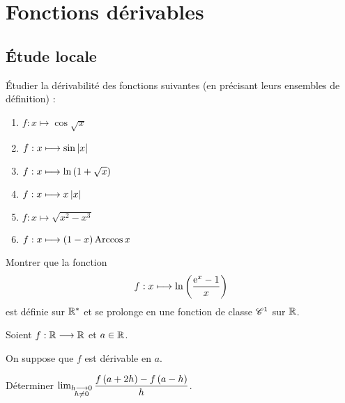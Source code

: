 \chapter{Fonctions dérivables}

\minitoc

\section{Étude locale}

\begin{exo}[Exercice 1]
Étudier la dérivabilité des fonctions suivantes (en précisant leurs ensembles de définition) :

\begin{enumerate}
\item \(f:x\mapsto\cos\sqrt{x}\) \\

\item \(f:x\longmapsto\sin\left\lvert x\right\rvert\) \\

\item \(f:x\longmapsto\ln\left(1+\sqrt{x}\right)\) \\

\item \(f:x\longmapsto x\left\lvert x\right\rvert\) \\

\item \(f:x\mapsto\sqrt{x^2-x^3}\) \\

\item \(f:x\longmapsto\left(1-x\right)\operatorname{Arccos} x\)
\end{enumerate}
\end{exo}

\begin{corr}
\end{corr}

\begin{exo}[Exercice 2]
Montrer que la fonction \[f:x\longmapsto\ln\left(\dfrac{\mathrm{e}^{x}-1}{x}\right)\] est définie sur \(\mathbb{R}^*\) et se prolonge en une fonction de classe \(\mathscr{C}^{1}\) sur \(\mathbb{R}\).
\end{exo}

\begin{corr}
\end{corr}

\begin{exo}[Exercice 3]
Soient \(f:\mathbb{R}\longrightarrow\mathbb{R}\) et \(a\in\mathbb{R}\).

On suppose que \(f\) est dérivable en \(a\).

Déterminer \(\lim_{\substack{h\longrightarrow0 \\ h\not=0}}\dfrac{f\left(a+2h\right)-f\left(a-h\right)}{h}\).
\end{exo}

